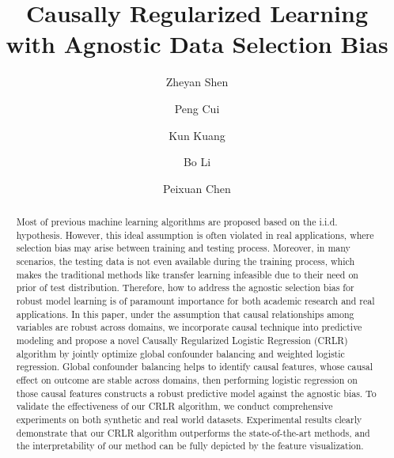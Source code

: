 \documentclass[sigconf]{acmart}
\begin{document}
\title{Causally Regularized Learning with Agnostic Data Selection Bias}

\author{Zheyan Shen}

\author{Peng Cui}

\author{Kun Kuang}

\author{Bo Li}

\author{Peixuan Chen}

\renewcommand{\shortauthors}{Z. Shen et al.}

\begin{abstract}
Most of previous machine learning algorithms are proposed based on the i.i.d. hypothesis.
However, this ideal assumption is often violated in real applications, where selection bias may arise between training and testing process.
Moreover, in many scenarios, the testing data is not even available during the training process, which makes the traditional methods like transfer learning infeasible due to their need on prior of test distribution.
Therefore, how to address the agnostic selection bias for robust model learning is of paramount importance for both academic research and real applications.
In this paper, under the assumption that causal relationships among variables are robust across domains, we incorporate causal technique into predictive modeling and propose a novel Causally Regularized Logistic Regression (CRLR) algorithm by jointly optimize global confounder balancing and weighted logistic regression.
Global confounder balancing helps to identify causal features, whose causal effect on outcome are stable across domains, then performing logistic regression on those causal features constructs a robust predictive model against the agnostic bias.
To validate the effectiveness of our CRLR algorithm, we conduct comprehensive experiments on both synthetic and real world datasets.
Experimental results clearly demonstrate that our CRLR algorithm outperforms the state-of-the-art methods, and the interpretability of our method can be fully depicted by the feature visualization.
\end{abstract}
\end{document}
